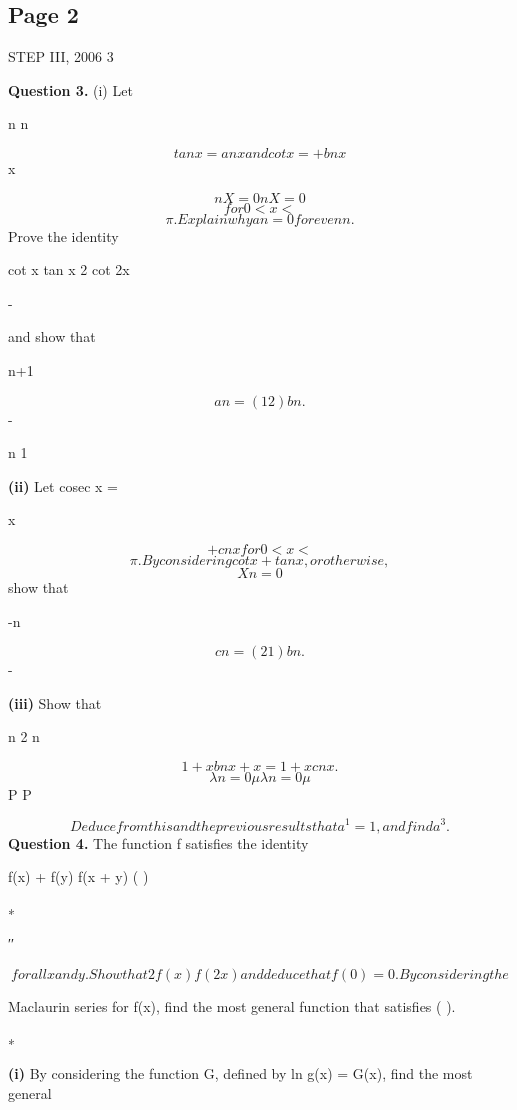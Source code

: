 \documentclass[12pt]{article}
\begin{document}
\subsection*{Page 2}
\begin{flushleft}
STEP III, 2006 3\par
\bigskip\textbf{Question 3.} (i) Let\par
\infty \infty\par
n n\par
\[tan x = anx and cot x = + bnx\]
x\par
\[nX=0 nX=0\]
\[for 0 < x <\]
\[\pi . Explain why an = 0 for even n.\]
Prove the identity\par
cot x tan x 2 cot 2x\par
- \equiv\par
and show that\par
n+1\par
\[an = (1 2 )bn .\]
-\par
\infty\par
n 1\par
\textbf{(ii)} Let cosec x =\par
x\par
\[+ cnx for 0 < x <\]
\[\pi . By considering cot x + tan x, or otherwise,\]
\[Xn=0\]
show that\par
-n\par
\[cn = (2 1)bn .\]
-\par
\textbf{(iii)} Show that\par
{} \par
n 2 n\par
\[1 + x bnx + x = 1 + x cnx .\]
\[\lambda n=0 \mu \lambda n=0 \mu\]
P P\par
\[Deduce from this and the previous results that a^1 = 1, and find a^3.\]
\bigskip\textbf{Question 4.} The function f satisfies the identity\par
f(x) + f(y) f(x + y) ( )\par
\equiv ∗\par
′′\par
\[for all x and y. Show that 2f(x) f(2x) and deduce that f (0) = 0. By considering the\]
\equiv\par
Maclaurin series for f(x), find the most general function that satisfies ( ).\par
∗\par
[Do not consider issues of existence or convergence of Maclaurin series in this question.]\par
\textbf{(i)} By considering the function G, defined by ln g(x) = G(x), find the most general\par

\end{flushleft}
\end{document}

